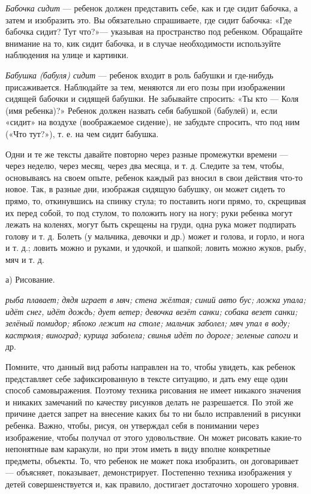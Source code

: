 \documentclass{book}
\renewcommand{\emph}[1]{\textit{#1}}
\begin{document}
\emph{Бабочка сидит} --- ребенок должен представить себе, как и где
сидит бабочка, а затем и изобразить это. Вы обязательно спрашиваете, где
сидит бабочка: «Где бабочка сидит? Тут что?»--- указывая на пространство
под ребенком. Обращайте внимание на то, кик сидит бабочка, и в случае
необходимости используйте наблюдения на улице и картинки.

\emph{Бабушка (бабуля) сидит} --- ребенок входит в роль бабушки и
где-нибудь присаживается. Наблюдайте за тем, меняются ли его позы при
изображении сидящей бабочки и сидящей бабушки. Не забывайте спросить:
«Ты кто --- Коля (имя ребенка)?» Ребенок должен назвать себя бабушкой
(бабулей) и, если «сидит» на воздухе (воображаемое сидение), не забудьте
спросить, что под ним («Что тут?»), т. е. на чем сидит бабушка.

Одни и те же тексты давайте повторно через разные промежутки времени ---
через неделю, через месяц, через два месяца, и т. д. Следите за тем,
чтобы, основываясь на своем опыте, ребенок каждый раз вносил в свои
действия что-то новое. Так, в разные дни, изображая сидящую бабушку, он
может сидеть то прямо, то, откинувшись на спинку стула; то поставить
ноги прямо, то, скрещивая их перед собой, то под стулом, то положить
ногу на ногу; руки ребенка могут лежать на коленях, могут быть скрещены
на груди, одна рука может подпирать голову и т. д. Болеть (у мальчика,
девочки и др.) может и голова, и горло, и нога и т. д.; ловить можно и
руками, и удочкой, и шапкой; ловить можно жуков, рыбу, мяч и т. д.

а) Рисование.

\emph{рыба плавает; дядя играет в мяч; стена жёлтая; синий авто бус;
ложка упала; идёт снег, идёт дождь; дует ветер; девочка везёт санки;
собака везет санки; зелёный помидор; яблоко лежит на столе; мальчик
заболел; мяч упал в воду; кастрюля; виноград; курица заболела; свинья
идёт по дороге; зеленые сапоги} и др.

Помните, что данный вид работы направлен на то, чтобы увидеть, как
ребенок представляет себе зафиксированную в тексте ситуацию, и дать ему
еще один способ самовыражения. Поэтому техника рисования не имеет
никакого значения и никаких замечаний по качеству рисунков делать не
разрешается. По этой же причине дается запрет на внесение каких бы то ни
было исправлений в рисунки ребенка. Важно, чтобы, рисуя, он утверждал
себя в понимании через изображение, чтобы получал от этого удовольствие.
Он может рисовать какие-то непонятные вам каракули, но при этом иметь в
виду вполне конкретные предметы, объекты. То, что ребенок не может пока
изобразить, он договаривает --- объясняет, показывает, демонстрирует.
Постепенно техника изображения у детей совершенствуется и, как правило,
достигает достаточно хорошего уровня.
\end{document}
